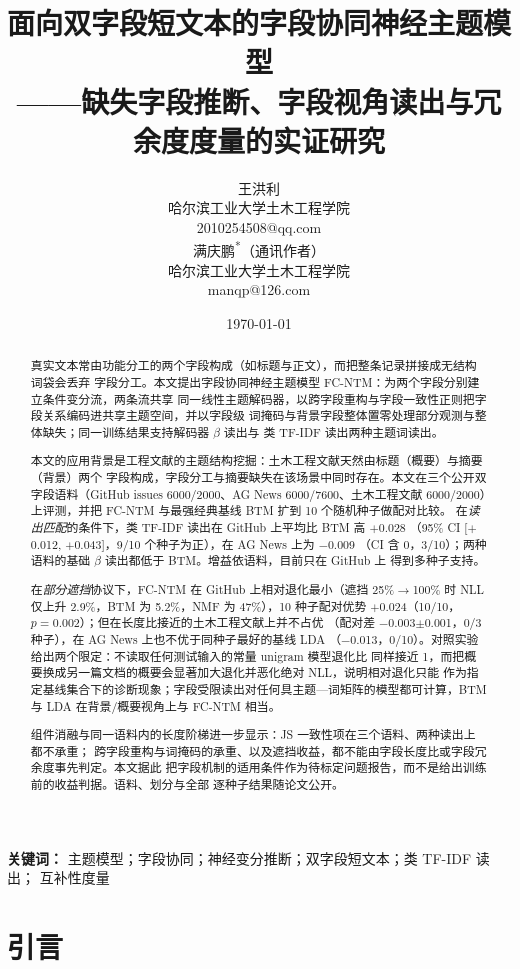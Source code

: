 \documentclass[11pt]{ctexart}
\title{\bfseries 面向双字段短文本的字段协同神经主题模型\\[4pt]
       \large ——缺失字段推断、字段视角读出与冗余度度量的实证研究}
\author{王洪利\\[2pt]{\small 哈尔滨工业大学土木工程学院}\\[1pt]{\small 2010254508@qq.com}\\[8pt]
        满庆鹏\textsuperscript{*}（通讯作者）\\[2pt]{\small 哈尔滨工业大学土木工程学院}\\[1pt]{\small manqp@126.com}}
\date{\today}
\newcommand{\fcntm}{FC-NTM}
\begin{document}
\maketitle

\begin{abstract}
真实文本常由功能分工的两个字段构成（如标题与正文），而把整条记录拼接成无结构词袋会丢弃
字段分工。本文提出字段协同神经主题模型 \fcntm{}：为两个字段分别建立条件变分流，两条流共享
同一线性主题解码器，以跨字段重构与字段一致性正则把字段关系编码进共享主题空间，并以字段级
词掩码与背景字段整体置零处理部分观测与整体缺失；同一训练结果支持解码器 $\beta$ 读出与
类 TF-IDF 读出两种主题词读出。

本文的应用背景是工程文献的主题结构挖掘：土木工程文献天然由标题（概要）与摘要（背景）两个
字段构成，字段分工与摘要缺失在该场景中同时存在。本文在三个公开双字段语料（GitHub issues 6000/2000、AG News 6000/7600、土木工程文献
6000/2000）上评测，并把 \fcntm{} 与最强经典基线 BTM 扩到 10 个随机种子做配对比较。
在\emph{读出匹配}的条件下，类 TF-IDF 读出在 GitHub 上平均比 BTM 高 $+$0.028
（95\% CI [$+$0.012, $+$0.043]，9/10 个种子为正），在 AG News 上为 $-$0.009
（CI 含 0，3/10）；两种语料的基础 $\beta$ 读出都低于 BTM。增益依语料，目前只在 GitHub 上
得到多种子支持。

在\emph{部分遮挡}协议下，\fcntm{} 在 GitHub 上相对退化最小（遮挡
25\%$\rightarrow$100\% 时 NLL 仅上升 2.9\%，BTM 为 5.2\%，NMF 为 47\%），10 种子配对优势
$+$0.024（10/10，$p=0.002$）；但在长度比接近的土木工程文献上并不占优
（配对差 $-$0.003$\pm$0.001，0/3 种子），在 AG News 上也不优于同种子最好的基线 LDA
（$-$0.013，0/10）。对照实验给出两个限定：不读取任何测试输入的常量 unigram 模型退化比
同样接近 1，而把概要换成另一篇文档的概要会显著加大退化并恶化绝对 NLL，说明相对退化只能
作为指定基线集合下的诊断现象；字段受限读出对任何具主题—词矩阵的模型都可计算，BTM 与 LDA
在背景/概要视角上与 \fcntm{} 相当。

组件消融与同一语料内的长度阶梯进一步显示：JS 一致性项在三个语料、两种读出上都不承重；
跨字段重构与词掩码的承重、以及遮挡收益，都不能由字段长度比或字段冗余度事先判定。本文据此
把字段机制的适用条件作为待标定问题报告，而不是给出训练前的收益判据。语料、划分与全部
逐种子结果随论文公开。
\end{abstract}

\noindent\textbf{关键词：} 主题模型；字段协同；神经变分推断；双字段短文本；类 TF-IDF 读出；
互补性度量

\section{引言}
\end{document}
